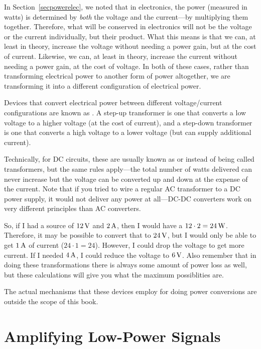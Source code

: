 In Section~\ref{secpowerelec}, we noted that in electronics, the power (measured in watts) is determined by \emph{both} the voltage and the current---by multiplying them together.
Therefore, what will be conserved in electronics will not be the voltage or the current individually, but their product.
What this means is that we can, at least in theory, increase the voltage without needing a power gain, but at the cost of current.
Likewise, we can, at least in theory, increase the current without needing a power gain, at the cost of voltage.
In both of these cases, rather than transforming electrical power to another form of power altogether, we are transforming it into a different configuration of electrical power.

Devices that convert electrical power between different voltage/current configurations are known as .
A step-up transformer is one that converts a low voltage to a higher voltage (at the cost of current), and a step-down transformer is one that converts a high voltage to a lower voltage (but can supply additional current).

Technically, for DC circuits, these are usually known as  or  instead of being called transformers, but the same rules apply---the total number of watts delivered can never increase but the voltage can be converted up and down at the expense of the current.
Note that if you tried to wire a regular AC transformer to a DC power supply, it would not deliver any power at all---DC-DC converters work on very different principles than AC converters.

So, if I had a source of $12\,\si{\volt}$ and $2\,\si{\ampere}$, then I would have a $12\cdot 2=24\,\si{\watt}$.
Therefore, it may be possible to convert that to $24\,\si{\volt}$, but I would only be able to get $1\,\si{\ampere}$ of current ($24\cdot 1=24$).
However, I could drop the voltage to get more current.  
If I needed $4\,\si{\ampere}$, I could reduce the voltage to $6\,\si{\volt}$.
Also remember that in doing these transformations there is always some amount of power loss as well, but these calculations will give you what the maximum possiblities are.

The actual mechanisms that these devices employ for doing power conversions are outside the scope of this book.

\section{Amplifying Low-Power Signals}

